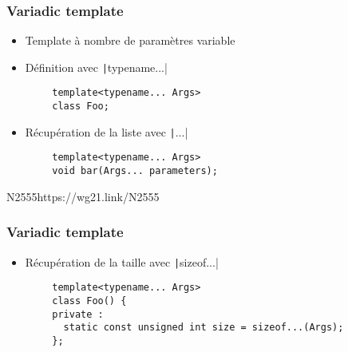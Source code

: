 \documentclass[C++.tex]{subfiles}
\begin{document}
\begin{frame}[fragile]
	\frametitle{Variadic template}
	\begin{itemize}
		\item Template à nombre de paramètres variable
		\item Définition avec \texttt|typename...|
	\end{itemize}

	\begin{verbatim}
		template<typename... Args>
		class Foo;
	\end{verbatim}

	\begin{itemize}
		\item Récupération de la liste avec \texttt|...|
	\end{itemize}

	\begin{verbatim}
		template<typename... Args>
		void bar(Args... parameters);
	\end{verbatim}

		{N2555}{https://wg21.link/N2555}
\end{frame}

\begin{frame}[fragile]
	\frametitle{Variadic template}
	\begin{itemize}
		\item Récupération de la taille avec \texttt|sizeof...|
	\end{itemize}

	\begin{verbatim}
		template<typename... Args>
		class Foo() {
		private :
		  static const unsigned int size = sizeof...(Args);
		};
	\end{verbatim}
\end{frame}
\end{document}
